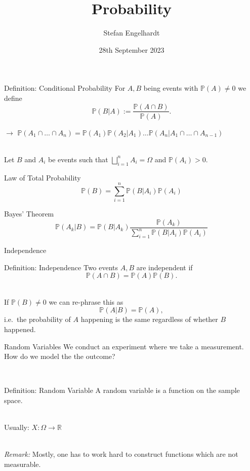 \documentclass[11pt,pdf,ngerman,UKenglish]{beamer}%
\title{Probability}
\author{Stefan Engelhardt}
\date{28th September 2023}%
\newcommand{\IR}{\mathds{R}}
\newcommand{\IP}{\mathbb{P}}
\newcommand{\1}{\mathbb{1}}
\theoremstyle{thm}
\theoremstyle{def}
\begin{document}
\begin{frame}
\titlepage
\end{frame}
\logo{}




\begin{frame}
\begin{block}{Definition: Conditional Probability}
For $A,B$ being events with $\IP(A) \neq 0$ we define
$$\IP(B \vert A) := \frac{\IP(A \cap B)}{\IP(A)}.$$
\end{block}
$\to$ $\IP(A_1 \cap \ldots \cap A_n) = \IP(A_1) \IP(A_2 \vert A_1) \ldots \IP(A_n \vert A_1 \cap \ldots \cap A_{n-1})$

\ \\
Let $B$ and $A_i$ be events such that $\bigsqcup_{i=1}^n A_i = \Omega$ and $\IP(A_i) >0$.
\begin{block}{Law of Total Probability}
$$\IP(B)
= \sum_{i=1}^n \IP(B \vert A_i ) \IP(A_i)$$
\end{block}
\begin{block}{Bayes' Theorem}
$$
\IP(A_k \vert B) = \IP(B \vert A_k ) \frac{\IP(A_k)}{\sum_{i=1}^n \IP(B \vert A_i) \IP(A_i)}
$$
\end{block}
\end{frame}


\begin{frame}{Independence}
\begin{block}{Definition: Independence}
Two events $A,B$ are independent if
$$ \IP(A \cap B) = \IP(A) \IP(B).$$
\end{block}

\ \\
If $\IP(B) \neq 0$ we can re-phrase this as
$$ \IP(A \vert B) = \IP(A),$$
i.e.\ the probability of $A$ happening is the same regardless of whether $B$ happened.

\end{frame}


\begin{frame}{Random Variables}
We conduct an experiment where we take a measurement. How do we model the the outcome?

\
\pause
\begin{block}{Definition: Random Variable}
A random variable is a {\color{gray}{measurable}} function on the sample space.
\end{block}
\ \\
Usually: $X: \Omega \to \IR$

\pause
\ \\
\textit{Remark:} Mostly, one has to work hard to construct functions which are not measurable.
\end{frame}
\end{document}
